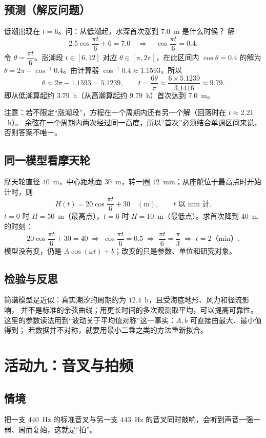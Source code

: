 \subsection{预测（解反问题）}
低潮出现在 $t=6$。问：从低潮起，水深首次涨到 $7.0$~m 是什么时候？
解
\[
  2.5\cos\frac{\pi t}{6}+6=7.0
  \quad\Longrightarrow\quad
  \cos\frac{\pi t}{6}=0.4.
\]
令 $\theta=\dfrac{\pi t}{6}$。涨潮段 $t\in[6,12]$ 对应 $\theta\in[\pi,2\pi]$，在此区间内
$\cos\theta=0.4$ 的解为 $\theta=2\pi-\cos^{-1}0.4$。由计算器 $\cos^{-1}0.4\approx1.1593$，所以
\[
  \theta\approx2\pi-1.1593=5.1239,\qquad
  t=\frac{6\theta}{\pi}\approx\frac{6\times5.1239}{3.1416}\approx9.79.
\]
即从低潮算起约 $3.79$~h（从高潮算起约 $9.79$~h）首次达到 $7.0$~m。

注意：若不限定“涨潮段”，方程在一个周期内还有另一个解（回落时在 $t\approx2.21$~h）。
余弦在一个周期内两次经过同一高度，所以“首次”必须结合单调区间来说，否则答案不唯一。

\subsection{同一模型看摩天轮}
摩天轮直径 $40$~m，中心距地面 $30$~m，转一圈 $12$~min；从座舱位于最高点时开始计时，则
\[
  H(t)=20\cos\frac{\pi t}{6}+30\quad(\text{m}),\qquad t\text{ 以 min 计}.
\]
$t=0$ 时 $H=50$~m（最高点），$t=6$ 时 $H=10$~m（最低点）。求首次降到 $40$~m 的时刻：
\[
  20\cos\frac{\pi t}{6}+30=40
  \;\Longrightarrow\;
  \cos\frac{\pi t}{6}=0.5
  \;\Longrightarrow\;
  \frac{\pi t}{6}=\frac{\pi}{3}
  \;\Longrightarrow\;
  t=2\text{（min）}.
\]
模型没有变，仍是 $A\cos(\omega t)+b$；改变的只是参数、单位和研究对象。

\subsection{检验与反思}
简谐模型是近似：真实潮汐的周期约为 $12.4$~h，且受海底地形、风力和径流影响，
并不是标准的余弦曲线；用更长时间的多次观测取平均，可以提高可靠性。
这里的参数读法用到“波动关于平均值对称”这一事实：$A,b$ 可直接由最大、最小值得到；
若数据并不对称，就要用最小二乘之类的方法重新拟合。

\section{活动九：音叉与拍频}

\subsection{情境}
把一支 $440$~Hz 的标准音叉与另一支 $443$~Hz 的音叉同时敲响，会听到声音一强一弱、周而复始，这就是“拍”。

